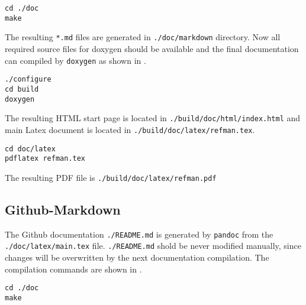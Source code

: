 \begin{lstlisting}[caption={Markdown files generation},label={code:dox:doxy-markdown}]
cd ./doc
make
\end{lstlisting}

The resulting \lstinline|*.md| files are generated in \lstinline|./doc/markdown| directory.
Now all required source files for doxygen should be available and the final documentation can compiled by \lstinline|doxygen| as shown in .

\begin{lstlisting}[caption={Make HTML and Latex documents},label={code:doc:doxygen}]
./configure
cd build
doxygen
\end{lstlisting}

The resulting HTML start page is located in \lstinline|./build/doc/html/index.html| and main Latex document is located in \lstinline|./build/doc/latex/refman.tex|.

\begin{lstlisting}[caption={Comple PDF with API reference},label={code:doc:doxygen:pdf}]
cd doc/latex
pdflatex refman.tex
\end{lstlisting}

The resulting PDF file is \lstinline|./build/doc/latex/refman.pdf|

\subsection{Github-Markdown}
The Github documentation \lstinline|./README.md| is generated by \lstinline|pandoc| from the \lstinline|./doc/latex/main.tex| file.
\lstinline|./README.md| shold be never modified manually, since changes will be overwritten by the next documentation compilation.
The compilation commands are shown in .

\begin{lstlisting}[caption={Make ./README.md},label={code:doc:gfm}]
cd ./doc
make
\end{lstlisting}
